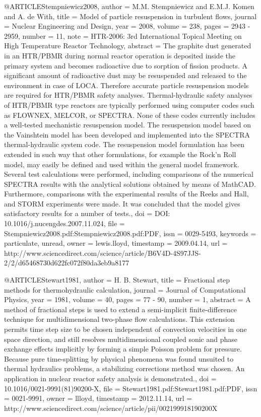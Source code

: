 {{@ARTICLE{Stempniewicz2008,
  author = {M.M. Stempniewicz and E.M.J. Komen and A. de With},
  title = {Model of particle resuspension in turbulent flows},
  journal = {Nuclear Engineering and Design},
  year = {2008},
  volume = {238},
  pages = {2943 - 2959},
  number = {11},
  note = {HTR-2006: 3rd International Topical Meeting on High Temperature Reactor
	Technology},
  abstract = {The graphite dust generated in an HTR/PBMR during normal reactor operation
	is deposited inside the primary system and becomes radioactive due
	to sorption of fission products. A significant amount of radioactive
	dust may be resuspended and released to the environment in case of
	LOCA. Therefore accurate particle resuspension models are required
	for HTR/PBMR safety analyses. Thermal-hydraulic safety analyses of
	HTR/PBMR type reactors are typically performed using computer codes
	such as FLOWNEX, MELCOR, or SPECTRA. None of these codes currently
	includes a well-tested mechanistic resuspension model. The resuspension
	model based on the Vainshtein model has been developed and implemented
	into the SPECTRA thermal-hydraulic system code. The resuspension
	model formulation has been extended in such way that other formulations,
	for example the Rock'n Roll model, may easily be defined and used
	within the general model framework. Several test calculations were
	performed, including comparisons of the numerical SPECTRA results
	with the analytical solutions obtained by means of MathCAD. Furthermore,
	comparisons with the experimental results of the Reeks and Hall,
	and STORM experiments were made. It was concluded that the model
	gives satisfactory results for a number of tests.},
  doi = {DOI: 10.1016/j.nucengdes.2007.11.024},
  file = {Stempniewicz2008.pdf:Stempniewicz2008.pdf:PDF},
  issn = {0029-5493},
  keywords = {particulate, unread},
  owner = {lewis.lloyd},
  timestamp = {2009.04.14},
  url = {http://www.sciencedirect.com/science/article/B6V4D-4S97JJS-2/2/d65468730d622fc072f80da3eb9a8177}
}

@ARTICLE{Stewart1981,
  author = {H. B. Stewart},
  title = {Fractional step methods for thermohydraulic calculation},
  journal = {Journal of Computational Physics},
  year = {1981},
  volume = {40},
  pages = {77 - 90},
  number = {1},
  abstract = {A method of fractional steps is used to extend a semi-implicit finite-difference
	technique for multidimensional two-phase flow calculations. This
	extension permits time step size to be chosen independent of convection
	velocities in one space direction, and still resolves multidimensional
	coupled sonic and phase exchange effects implicitly by forming a
	simple Poisson problem for pressure. Because pure time-splitting
	by physical phenomena was found unsuited to thermal hydraulics problems,
	a stabilizing corrections method was chosen. An application in nuclear
	reactor safety analysis is demonstrated.},
  doi = {10.1016/0021-9991(81)90200-X},
  file = {Stewart1981.pdf:Stewart1981.pdf:PDF},
  issn = {0021-9991},
  owner = {llloyd},
  timestamp = {2012.11.14},
  url = {http://www.sciencedirect.com/science/article/pii/002199918190200X}
}

}}
